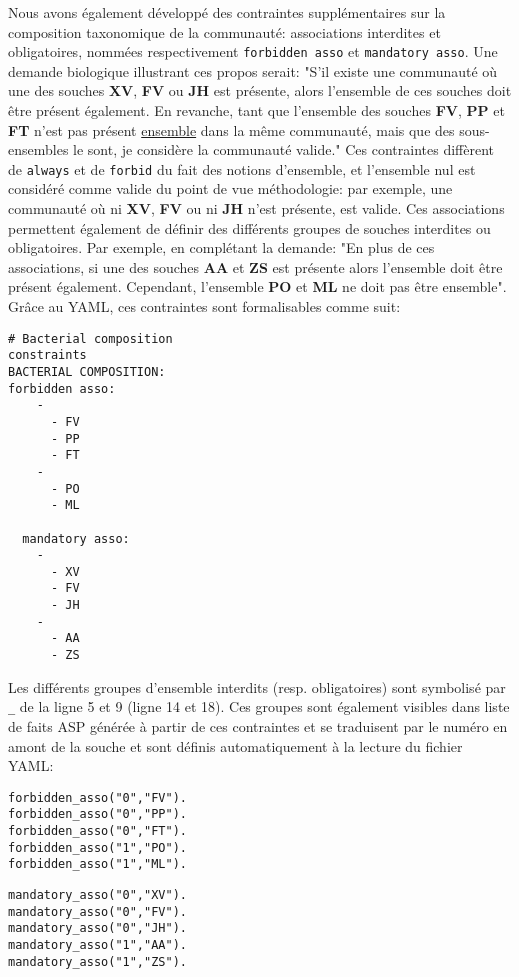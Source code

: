 \documentclass[../main.tex]{subfiles}
\begin{document}
Nous avons également développé des contraintes supplémentaires sur la composition taxonomique de la communauté: associations interdites et obligatoires, nommées respectivement \texttt{forbidden asso} et \texttt{mandatory asso}. Une demande biologique illustrant ces propos serait: "S’il existe une communauté où une des souches \textbf{XV}, \textbf{FV} ou \textbf{JH} est présente, alors l'ensemble de ces souches doit être présent également. En revanche, tant que l'ensemble des souches \textbf{FV}, \textbf{PP} et \textbf{FT} n'est pas présent \underline{ensemble} dans la même communauté, mais que des sous-ensembles le sont, je considère la communauté valide." Ces contraintes diffèrent de \texttt{always} et de \texttt{forbid} du fait des notions d'ensemble, et l'ensemble nul est considéré comme valide du point de vue méthodologie: par exemple,  une communauté où ni \textbf{XV}, \textbf{FV} ou ni \textbf{JH} n'est présente, est valide. Ces associations permettent également de définir des différents groupes de souches interdites ou obligatoires. Par exemple, en complétant la demande: "En plus de ces associations, si une des souches \textbf{AA} et \textbf{ZS} est présente alors l'ensemble doit être présent également. Cependant, l'ensemble \textbf{PO} et \textbf{ML} ne doit pas être ensemble". Grâce au YAML, ces contraintes sont formalisables comme suit:


\noindent
\begin{lstlisting}[style=yaml]
# Bacterial composition 
constraints
BACTERIAL COMPOSITION:
forbidden asso: 
    - 
      - FV
      - PP
      - FT
    - 
      - PO
      - ML

  mandatory asso: 
    - 
      - XV
      - FV
      - JH
    - 
      - AA
      - ZS
\end{lstlisting}
Les différents groupes d'ensemble interdits (resp. obligatoires) sont symbolisé par \texttt{\_} de la ligne 5 et 9 (ligne 14 et 18). Ces groupes sont également visibles dans liste de faits ASP générée à partir de ces contraintes et se traduisent par le numéro en amont de la souche et sont définis automatiquement à la lecture du fichier YAML:\\

\noindent
\begin{minipage}[t]{0.45\textwidth}
\begin{lstlisting}
forbidden_asso("0","FV").
forbidden_asso("0","PP").
forbidden_asso("0","FT").
forbidden_asso("1","PO").
forbidden_asso("1","ML").
\end{lstlisting}
\end{minipage}%
\hspace{2em}\begin{minipage}[t]{0.5\textwidth}
\begin{lstlisting}
mandatory_asso("0","XV").
mandatory_asso("0","FV").
mandatory_asso("0","JH").
mandatory_asso("1","AA").
mandatory_asso("1","ZS").
\end{lstlisting}
\end{minipage}
\end{document}
